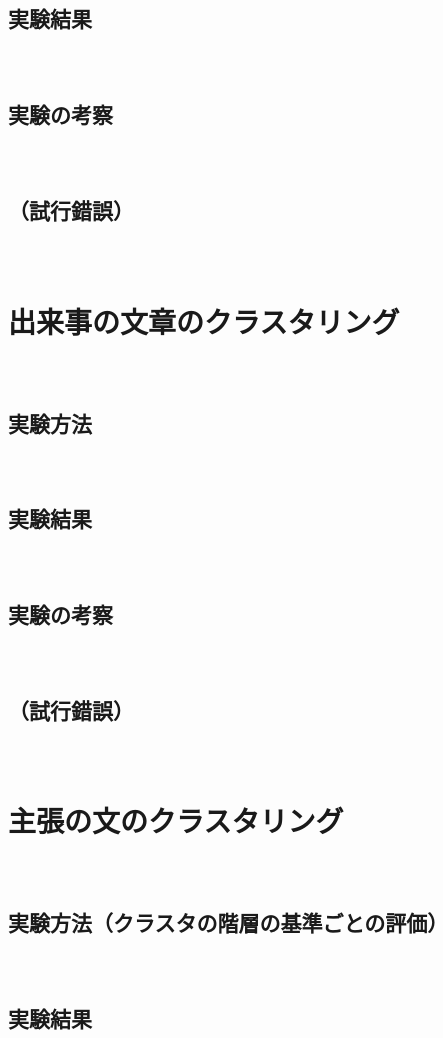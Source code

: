 \documentclass[12pt,a4j]{jreport}
\begin{document}
\subsection{実験結果}
~

\subsection{実験の考察}
~

\subsection{（試行錯誤）}
~

\section{出来事の文章のクラスタリング}
~

\subsection{実験方法}
~

\subsection{実験結果}
~

\subsection{実験の考察}
~

\subsection{（試行錯誤）}
~

\section{主張の文のクラスタリング}
~

\subsection{実験方法（クラスタの階層の基準ごとの評価）}
~

\subsection{実験結果}
~
\end{document}
